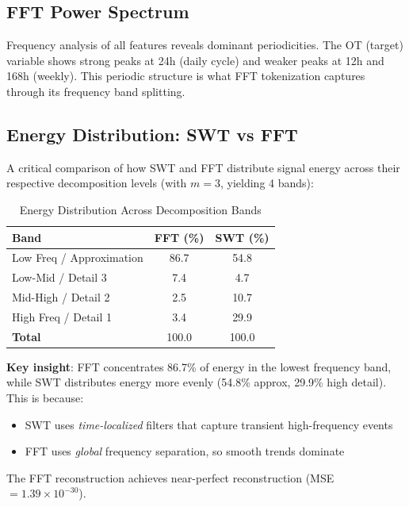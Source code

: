\documentclass[12pt,a4paper]{article}
\begin{document}
\subsection{FFT Power Spectrum}

Frequency analysis of all features reveals dominant periodicities. The OT (target) variable shows strong peaks at 24h (daily cycle) and weaker peaks at 12h and 168h (weekly). This periodic structure is what FFT tokenization captures through its frequency band splitting.

\subsection{Energy Distribution: SWT vs FFT}

A critical comparison of how SWT and FFT distribute signal energy across their respective decomposition levels (with $m=3$, yielding 4 bands):

\begin{table}[H]
\centering
\caption{Energy Distribution Across Decomposition Bands}
\label{tab:energy}
\begin{tabular}{lcc}
\toprule
\textbf{Band} & \textbf{FFT (\%)} & \textbf{SWT (\%)} \\
\midrule
Low Freq / Approximation & 86.7 & 54.8 \\
Low-Mid / Detail 3 & 7.4 & 4.7 \\
Mid-High / Detail 2 & 2.5 & 10.7 \\
High Freq / Detail 1 & 3.4 & 29.9 \\
\midrule
\textbf{Total} & 100.0 & 100.0 \\
\bottomrule
\end{tabular}
\end{table}

\textbf{Key insight}: FFT concentrates 86.7\% of energy in the lowest frequency band, while SWT distributes energy more evenly (54.8\% approx, 29.9\% high detail). This is because:
\begin{itemize}[noitemsep]
  \item SWT uses \textit{time-localized} filters that capture transient high-frequency events
  \item FFT uses \textit{global} frequency separation, so smooth trends dominate
\end{itemize}

The FFT reconstruction achieves near-perfect reconstruction (MSE $= 1.39 \times 10^{-30}$).

\end{document}
